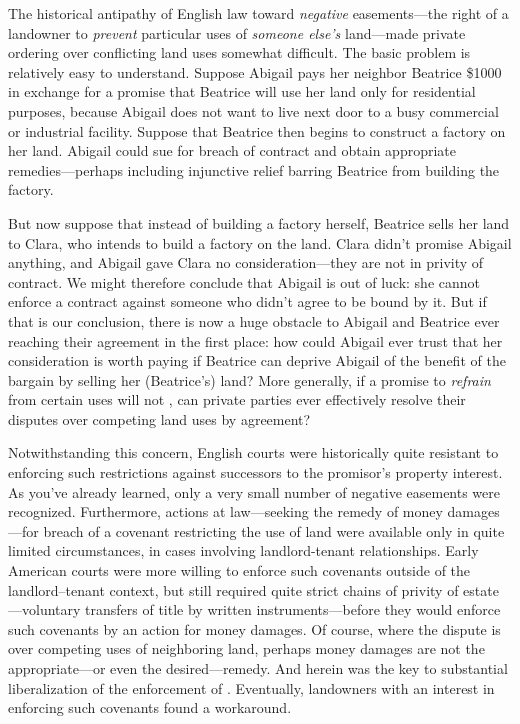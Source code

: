 
\label{abigail-beatrice-clara}

The historical antipathy of English law toward \textit{negative} easements---the
right of a landowner to \textit{prevent} particular uses of \textit{someone
else's} land---made private ordering over conflicting land uses somewhat
difficult. The basic problem is relatively easy to understand. Suppose Abigail
pays her neighbor Beatrice \$1000 in exchange for a promise that Beatrice will
use her land only for residential purposes, because Abigail does not want to
live next door to a busy commercial or industrial facility. Suppose that
Beatrice then begins to construct a factory on her land. Abigail could sue for
breach of contract and obtain appropriate remedies---perhaps including
injunctive relief barring Beatrice from building the factory.

But now suppose that instead of building a factory herself, Beatrice sells her
land to Clara, who intends to build a factory on the land. Clara didn't promise
Abigail anything, and Abigail gave Clara no consideration---they are not in
privity of contract. We might therefore conclude that Abigail is out of luck:
she cannot enforce a contract against someone who didn't agree to be bound by
it. But if that is our conclusion, there is now a huge obstacle to Abigail and
Beatrice ever reaching their agreement in the first place: how could Abigail
ever trust that her consideration is worth paying if Beatrice can deprive
Abigail of the benefit of the bargain by selling her (Beatrice's) land? More
generally, if a promise to \textit{refrain} from certain uses will not , can private parties ever effectively resolve their disputes
over competing land uses by agreement?


Notwithstanding this concern, English courts were historically quite resistant
to enforcing such restrictions against successors to the promisor's property
interest. As you've already learned, only a very small number of negative
easements were recognized. Furthermore, actions at law---seeking the remedy of
money damages---for breach of a covenant restricting the use of land were
available only in quite limited circumstances, in cases involving
landlord-tenant relationships. Early American courts were more willing to
enforce such covenants outside of the landlord--tenant context, but still
required quite strict chains of privity of estate---voluntary transfers of title
by written instruments---before they would enforce such covenants by an action
for money damages. Of course, where the dispute is over competing uses of
neighboring land, perhaps money damages are not the appropriate---or even the
desired---remedy. And herein was the key to substantial liberalization of the
enforcement of . Eventually,
landowners with an interest in
enforcing such covenants found a workaround.

